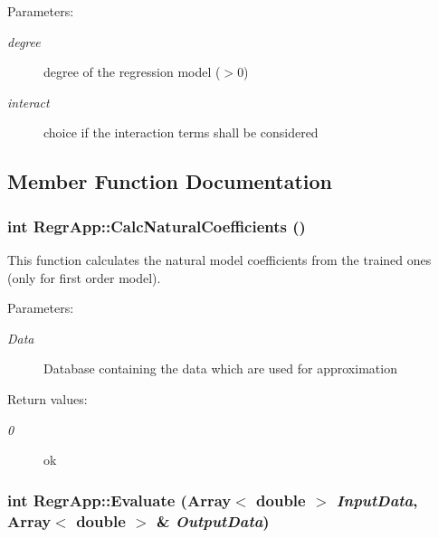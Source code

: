 \begin{Desc}
\item[Parameters:]
\begin{description}
\item[{\em degree}]degree of the regression model ($>$0) \item[{\em interact}]choice if the interaction terms shall be considered \end{description}
\end{Desc}


\subsection{Member Function Documentation}
\subsubsection{\setlength{\rightskip}{0pt plus 5cm}int Regr\-App::Calc\-Natural\-Coefficients ()}\label{classRegrApp_e56a976350597eb03c8afdafc74b561e}


This function calculates the natural model coefficients from the trained ones (only for first order model). 

\begin{Desc}
\item[Parameters:]
\begin{description}
\item[{\em Data}]Database containing the data which are used for approximation \end{description}
\end{Desc}
\begin{Desc}
\item[Return values:]
\begin{description}
\item[{\em 0}]ok \end{description}
\end{Desc}
\subsubsection{\setlength{\rightskip}{0pt plus 5cm}int Regr\-App::Evaluate (Array$<$ double $>$ {\em Input\-Data}, Array$<$ double $>$ \& {\em Output\-Data})}\label{classRegrApp_3d87f03fcc07f23d87acdfc89008a06d}



